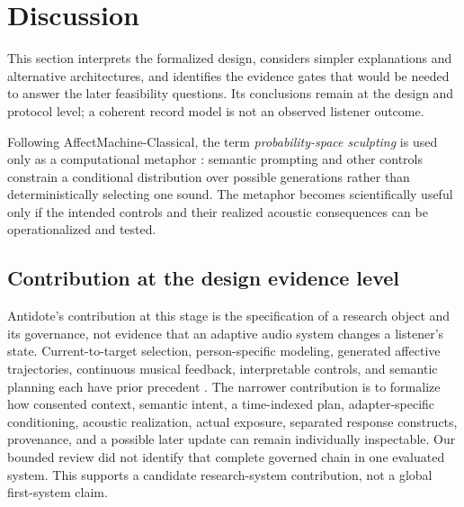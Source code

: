 \section{Discussion}
\label{sec:discussion}

This section interprets the formalized design, considers simpler explanations
and alternative architectures, and identifies the evidence gates that would be
needed to answer the later feasibility questions. Its conclusions remain at
the design and protocol level; a coherent record model is not an observed
listener outcome.

Following AffectMachine-Classical, the term \emph{probability-space sculpting}
is used only as a computational metaphor \citep{agres2023affectmachine}:
semantic prompting and other controls constrain a conditional distribution over
possible generations rather than deterministically selecting one sound. The
metaphor becomes scientifically useful only if the intended controls and their
realized acoustic consequences can be operationalized and tested.

\subsection{Contribution at the design evidence level}
\label{sec:discussion-design-contribution}

Antidote's contribution at this stage is the specification of a research
object and its governance, not evidence that an adaptive audio system changes a
listener's state. Current-to-target selection, person-specific modeling,
generated affective trajectories, continuous musical feedback, interpretable
controls, and semantic planning each have prior precedent
\citep{janssen2012tune,daly2016abcmi,ehrlich2019closedloop,
agres2023affectmachine,zhang2026mindmelody}. The narrower contribution is to
formalize how consented context, semantic intent, a time-indexed plan,
adapter-specific conditioning, acoustic realization, actual exposure,
separated response constructs, provenance, and a possible later update can
remain individually inspectable. Our bounded review did not identify that
complete governed chain in one evaluated system. This supports a candidate
research-system contribution, not a global first-system claim.

